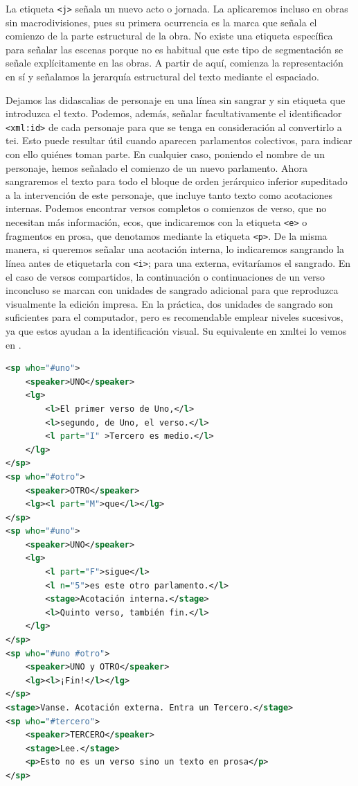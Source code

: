 La etiqueta \texttt{<j>} señala un nuevo acto o jornada. La aplicaremos incluso en obras sin macrodivisiones, pues su primera ocurrencia es la marca que señala el comienzo de la parte estructural de la obra. No existe una etiqueta específica para señalar las escenas porque no es habitual que este tipo de segmentación se señale explícitamente en las obras. A partir de aquí, comienza la representación en sí y señalamos la jerarquía estructural del texto mediante el espaciado.

Dejamos las didascalias de personaje en una línea sin sangrar y sin etiqueta que introduzca el texto. Podemos, además, señalar facultativamente el identificador \texttt{<xml:id>} de cada personaje para que se tenga en consideración  al convertirlo a \ac{tei}. Esto puede resultar útil cuando aparecen parlamentos colectivos, para indicar con ello quiénes toman parte. En cualquier caso, poniendo el nombre de un personaje, hemos señalado el comienzo de un nuevo parlamento. Ahora  sangraremos el texto para todo el bloque de orden jerárquico inferior supeditado a la intervención de este personaje, que incluye tanto texto como acotaciones internas. Podemos encontrar versos completos o comienzos de verso, que no necesitan más información, ecos, que indicaremos con la etiqueta \texttt{<e>} o fragmentos en prosa, que denotamos mediante la etiqueta \texttt{<p>}. De la misma manera, si queremos señalar una acotación interna, lo indicaremos sangrando la línea antes de etiquetarla con \texttt{<i>}; para una externa, evitaríamos el sangrado. En el caso de versos compartidos, la continuación o continuaciones de un verso inconcluso se marcan con unidades de sangrado adicional para que reproduzca visualmente la edición impresa. En la práctica, dos unidades de sangrado son suficientes para el computador, pero es recomendable emplear niveles sucesivos, ya que estos ayudan a la identificación visual. Su equivalente en \ac{xmltei} lo vemos en .

\begin{lstlisting}[frame=none,numbers=none,caption={Equivalente \ac{xmltei}.},language=xml, label={extendedchars:xmlved3}]
<sp who="#uno">
    <speaker>UNO</speaker>
    <lg>
        <l>El primer verso de Uno,</l>
        <l>segundo, de Uno, el verso.</l>
        <l part="I" >Tercero es medio.</l>
    </lg>
</sp>
<sp who="#otro">
    <speaker>OTRO</speaker>
    <lg><l part="M">que</l></lg>
</sp>
<sp who="#uno">
    <speaker>UNO</speaker>
    <lg>
        <l part="F">sigue</l>
        <l n="5">es este otro parlamento.</l>
        <stage>Acotación interna.</stage>
        <l>Quinto verso, también fin.</l>
    </lg>
</sp>
<sp who="#uno #otro">
    <speaker>UNO y OTRO</speaker>
    <lg><l>¡Fin!</l></lg>
</sp>
<stage>Vanse. Acotación externa. Entra un Tercero.</stage>
<sp who="#tercero">
    <speaker>TERCERO</speaker>
    <stage>Lee.</stage>
    <p>Esto no es un verso sino un texto en prosa</p>
</sp>
\end{lstlisting}


